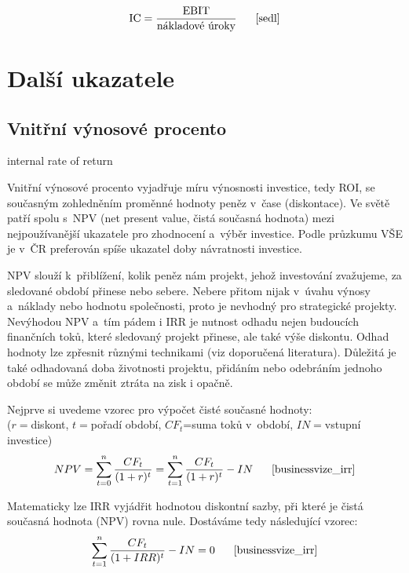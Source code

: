 $$\vz{IC}{EBIT}{nákladové úroky} \scite{sedl}$$








\section{Další ukazatele}

\subsection{Vnitřní výnosové procento}
internal rate of return

Vnitřní výnosové procento vyjadřuje míru výnosnosti investice, tedy ROI, se současným zohledněním proměnné hodnoty peněz v~čase (diskontace). Ve světě patří spolu s~NPV (net present value, čistá současná hodnota) mezi nejpoužívanější ukazatele pro zhodnocení a~výběr investice. Podle průzkumu VŠE je v~ČR preferován spíše ukazatel doby návratnosti investice\cite{businessvize_irr}.

NPV slouží k~přiblížení, kolik peněz nám projekt, jehož investování zvažujeme, za sledované období přinese nebo sebere. Nebere přitom nijak v~úvahu výnosy a~náklady nebo hodnotu společnosti, proto je nevhodný pro strategické projekty. Nevýhodou NPV a~tím pádem i IRR je nutnost odhadu nejen budoucích finančních toků, které sledovaný projekt přinese, ale také výše diskontu. Odhad hodnoty lze zpřesnit různými technikami (viz doporučená literatura). Důležitá je také odhadovaná doba životnosti projektu, přidáním nebo odebráním jednoho období se může změnit ztráta na zisk i opačně.

Nejprve si uvedeme vzorec pro výpočet čisté současné hodnoty: 
\\($r=$diskont, $t=$pořadí období, $CF_t$=suma toků v~období, $IN=$vstupní investice)
$$NPV=\sum\limits_{t=0}^{n} \dfrac{CF_t}{(1+r)^t} = \sum\limits_{t=1}^{n} \dfrac{CF_t}{(1+r)^t} - IN\scite{businessvize_irr}$$

Matematicky lze IRR vyjádřit hodnotou diskontní sazby, při které je čistá současná hodnota (NPV) rovna nule. Dostáváme tedy následující vzorec:
$$\sum\limits_{t=1}^{n} \dfrac{CF_t}{(1+IRR)^t} - IN = 0 \scite{businessvize_irr}$$

